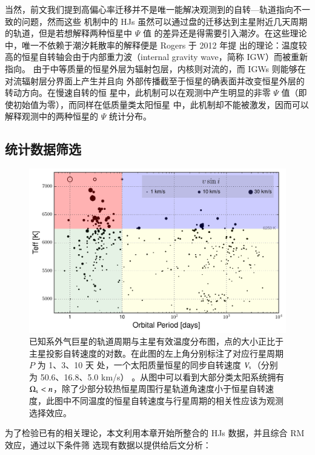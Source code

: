 当然，前文我们提到高偏心率迁移并不是唯一能解决观测到的自转---轨道指向不一致的问题，然而这些
机制中的 HJs 虽然可以通过盘的迁移达到主星附近几天周期的轨道，但是若想解释两种恒星中 $\Psi$ 值
的差异还是得需要引入潮汐。在这些理论中，唯一不依赖于潮汐耗散率的解释便是 Rogers 于 2012 年提
出的理论：温度较高的恒星自转轴会由于内部重力波（internal gravity wave，简称 IGW）而被重新指向。
由于中等质量的恒星外层为辐射包层，内核则对流的，而 IGWs 则能够在对流辐射层分界面上产生并且向
外部传播截至于恒星的确表面并改变恒星外层的转动方向\cite{Rogers2012,Rogers2015}。在慢速自转的恒
星中，此机制可以在观测中产生明显的非零 $\Psi$ 值（即使初始值为零），而同样在低质量类太阳恒星
中，此机制却不能被激发，因而可以解释观测中的两种恒星的 $\Psi$ 统计分布。


\subsection{统计数据筛选}

\begin{figure}[t]
\centering
\includegraphics[width=1.0\textwidth]{figures/chapter4/fig8_perteff.pdf}
\caption{已知系外气巨星的轨道周期与主星有效温度分布图，点的大小正比于主星投影自转速度的对数。在此图的左上角分别标注了对应行星周期 $P$ 为 1、3、10 天 处，一个太阳质量恒星的同步自转速度 $V_\mathrm{s} $（分别为 50.6、16.8、5.0 km/s） 。从图中可以看到大部分类太阳系统拥有 $\Omega_\mathrm{s} < n$，除了少部分较热恒星周围行星轨道角速度小于恒星自转速度，此图中不同温度的恒星自转速度与行星周期的相关性应该为观测选择效应。}
\label{fig:perteff}
\end{figure}

为了检验已有的相关理论，本文利用本章开始所整合的 HJs 数据，并且综合 RM 效应，通过以下条件筛
选现有数据以提供给后文分析：


